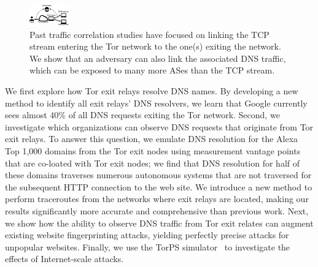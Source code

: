 \begin{figure}[t]
	\centering
	\includegraphics[width=0.65\linewidth]{figures/attack-concept.pdf}
	\caption{Past traffic correlation studies have focused on linking the TCP
		stream entering the Tor network to the one(s) exiting the network.  We
		show that an adversary can also link the associated DNS traffic, which
		can be exposed to many more ASes than the TCP stream.}
	\label{fig:overview}
\end{figure}

We first explore how Tor exit relays resolve DNS names.  By developing a
new method to identify all exit relays' DNS resolvers, we learn that Google
currently sees almost 40\% of all DNS requests exiting the Tor network.
Second, we investigate which organizations can observe
DNS requests that originate from Tor exit relays.  To answer this question, we emulate DNS
resolution for the Alexa Top 1,000 domains from the Tor exit nodes using
measurement vantage points that are co-loated with Tor exit nodes; we find that DNS
resolution for half of these domains traverses numerous autonomous
systems that are not traversed for the subsequent HTTP connection to the web
site.
We introduce a new
method to perform traceroutes from the networks where
exit relays are located, making our results significantly more accurate and
comprehensive than previous work.
Next, we show how the ability to observe DNS traffic from Tor
exit relates can
augment existing website fingerprinting attacks,
yielding perfectly precise \name attacks for unpopular websites.
Finally, we use the TorPS simulator~\cite{TorPS} to investigate the
effects of Internet-scale \name attacks.

